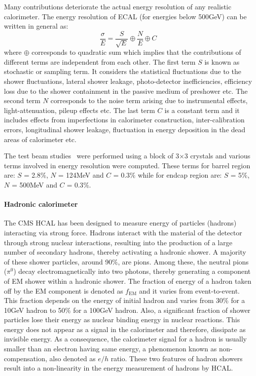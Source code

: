 Many contributions deteriorate the actual energy resolution of any realistic calorimeter. The energy resolution of ECAL
(for energies below 500\unit{GeV}) can be written in general as:
\begin{equation}
  \frac{\sigma}{E} = \frac{S}{\sqrt{E}} \oplus \frac{N}{E} \oplus C
\end{equation}
where $\oplus$ corresponds to quadratic sum which implies that the contributions of different terms are independent from each other. The first term $S$
is known as stochastic or sampling term. It considers the statistical fluctuations due to the shower fluctuations, lateral shower leakage,
photo-detector inefficiencies, efficiency loss due to the shower containment in the passive medium of preshower etc. The second term $N$ corresponds to the
noise term arising due to instrumental effects, light-attenuation, pileup effects etc. The last term $C$ is a constant term and it includes effects from
imperfections in calorimeter construction, inter-calibration errors, longitudinal shower leakage, fluctuation in energy deposition in the dead areas of calorimeter etc.


The test beam studies~\cite{Chatrchyan:2013dga} were performed using a block of 3$\times$3 crystals and various terms involved in energy resolution were computed. These terms
for barrel region are: $S$ = 2.8$\%$, $N$ = 124\unit{MeV} and $C$ = 0.3$\%$ while for endcap region are: $S$ = 5$\%$, $N$ = 500\unit{MeV} and $C$ = 0.3$\%$.

\paragraph{Hadronic calorimeter}
\hspace{\parindent} The CMS HCAL has been designed to measure energy of particles (hadrons) interacting via strong force. Hadrons interact with the material
of the detector through strong nuclear interactions, resulting into the production of a large number of
secondary hadrons, thereby activating a hadronic shower. A majority of these shower particles, around 90$\%$, are pions. Among these, the neutral pions ($\pi^{0}$)
decay electromagnetically into two photons, thereby generating a component of EM shower within a hadronic shower. The fraction of energy of a hadron taken off
by the EM component is denoted as $f_{\textrm{EM}}$ and it varies from event-to-event. This fraction depends on the energy of initial hadron and
varies from 30$\%$ for a 10\unit{GeV} hadron to 50$\%$ for a 100\unit{GeV} hadron. Also, a significant fraction of
shower particles lose their energy as nuclear binding energy in nuclear reactions. This energy does not appear as a signal in the calorimeter and therefore, dissipate as
invisible energy. As a consequence, the calorimeter signal for a hadron is usually smaller than an electron having same energy,
a phenomenon known as non-compensation, also denoted as $e/h$ ratio. These two features of hadron showers result into a non-linearity in
the energy measurement of hadrons by HCAL.

